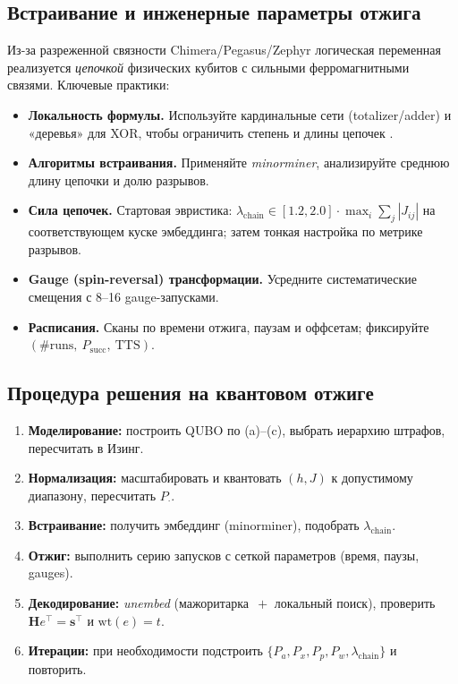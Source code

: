 \subsection{Встраивание и инженерные параметры отжига}
Из-за разреженной связности Chimera/Pegasus/Zephyr логическая переменная реализуется \emph{цепочкой} физических кубитов с сильными ферромагнитными связями. Ключевые практики:
\begin{itemize}
  \item \textbf{Локальность формулы.} Используйте кардинальные сети (totalizer/adder) и «деревья» для XOR, чтобы ограничить степень и длины цепочек \cite{Im2025}.
  \item \textbf{Алгоритмы встраивания.} Применяйте \textit{minorminer}, анализируйте среднюю длину цепочки и долю разрывов.
  \item \textbf{Сила цепочек.} Стартовая эвристика: $\lambda_{\text{chain}}\in[1.2,2.0]\cdot\max_{i} \sum_{j}|J_{ij}|$ на соответствующем куске эмбеддинга; затем тонкая настройка по метрике разрывов.
  \item \textbf{Gauge (spin-reversal) трансформации.} Усредните систематические смещения с 8–16 gauge-запусками.
  \item \textbf{Расписания.} Сканы по времени отжига, паузам и оффсетам; фиксируйте $(\text{\#runs},\ P_{\mathrm{succ}},\ \text{TTS})$.
\end{itemize}

\subsection{Процедура решения на квантовом отжиге}
\begin{enumerate}
  \item \textbf{Моделирование:} построить QUBO по (a)–(c), выбрать иерархию штрафов, пересчитать в Изинг.
  \item \textbf{Нормализация:} масштабировать и квантовать $(h,J)$ к допустимому диапазону, пересчитать $P_{\cdot}$.
  \item \textbf{Встраивание:} получить эмбеддинг (minorminer), подобрать $\lambda_{\text{chain}}$.
  \item \textbf{Отжиг:} выполнить серию запусков с сеткой параметров (время, паузы, gauges).
  \item \textbf{Декодирование:} \emph{unembed} (мажоритарка $\,+$ локальный поиск), проверить $\mathbf{H}e^\top=\mathbf{s}^\top$ и $\mathrm{wt}(e)=t$.
  \item \textbf{Итерации:} при необходимости подстроить $\{P_a,P_x,P_p,P_w,\lambda_{\text{chain}}\}$ и повторить.
\end{enumerate}

